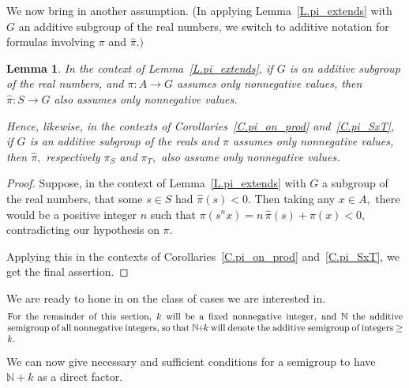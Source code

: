 \documentclass{amsart}
\newtheorem{lemma}[theorem]{Lemma}
\numberwithin{equation}{section}
\numberwithin{theorem}{section}
\newcommand{\N}{\mathbb{N}}
\begin{document}
We now bring in another assumption.
(In applying Lemma~\ref{L.pi_extends} with $G$ an additive
subgroup of the real numbers, we switch
to additive notation for formulas involving $\pi$ and $\hat{\pi}.)$

\begin{lemma}\label{L.pi_nonneg}
In the context of Lemma~\ref{L.pi_extends}, if $G$ is an additive
subgroup of the real numbers, and $\pi: A\to G$ assumes
only nonnegative values, then $\hat{\pi}: S\to G$ also
assumes only nonnegative values.

Hence, likewise, in the contexts of
Corollaries~\ref{C.pi_on_prod} and~\ref{C.pi_SxT}, if $G$ is an
additive subgroup of the reals and $\pi$ assumes only
nonnegative values, then $\hat{\pi},$ respectively
$\pi_S$ and $\pi_T,$ also assume only nonnegative values.
\end{lemma}

\begin{proof}
Suppose, in the context of Lemma~\ref{L.pi_extends}
with $G$ a subgroup of the real numbers,
that some $s\in S$ had $\hat{\pi}(s) < 0.$
Then taking any $x\in A,$ there would be a
positive integer $n$ such that $\pi(s^n x)=n\,\hat{\pi}(s)+\pi(x)<0,$
contradicting our hypothesis on $\pi.$

Applying this in the contexts of
Corollaries~\ref{C.pi_on_prod} and~\ref{C.pi_SxT},
we get the final assertion.
\end{proof}

We are ready to hone in on the class of cases we are interested in.
\vspace{.3em}
%
\begin{equation}\begin{minipage}[c]{35pc}\label{d.k}
For the remainder of this section,
$k$ will be a fixed nonnegative integer, and
$\N$ the additive semigroup of all nonnegative integers,
so that $\N\!+\!k$ will denote the additive
semigroup of integers~$\geq k.$
\end{minipage}\end{equation}

We can now give necessary and sufficient conditions for
a semigroup to have  $\N\!+\!k$ as a direct factor.
\end{document}
